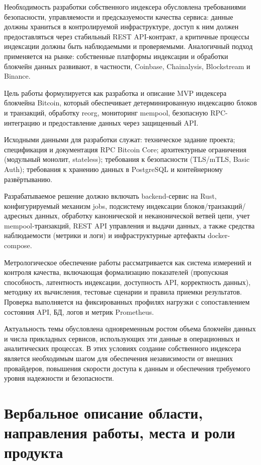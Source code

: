 ﻿\documentclass[14pt,a4paper]{extarticle}
\begin{document}
\noindent Необходимость разработки собственного индексера обусловлена требованиями безопасности, управляемости и предсказуемости качества сервиса: данные должны храниться в контролируемой инфраструктуре, доступ к ним должен предоставляться через стабильный REST API-контракт, а критичные процессы индексации должны быть наблюдаемыми и проверяемыми. Аналогичный подход применяется на рынке: собственные платформы индексации и обработки блокчейн данных развивают, в частности, Coinbase, Chainalysis, Blockstream и Binance.

\noindent Цель работы формулируется как разработка и описание MVP индексера блокчейна Bitcoin, который обеспечивает детерминированную индексацию блоков и транзакций, обработку reorg, мониторинг mempool, безопасную RPC-интеграцию и предоставление данных через защищенный API.

\noindent Исходными данными для разработки служат: техническое задание проекта; спецификация и документация RPC Bitcoin Core; архитектурные ограничения (модульный монолит, stateless); требования к безопасности (TLS/mTLS, Basic Auth); требования к хранению данных в PostgreSQL и контейнерному развёртыванию.

\noindent Разрабатываемое решение должно включать backend-сервис на Rust, конфигурируемый механизм jobs, подсистему индексации блоков/транзакций/адресных данных, обработку канонической и неканонической ветвей цепи, учет mempool-транзакций, REST API управления и выдачи данных, а также средства наблюдаемости (метрики и логи) и инфраструктурные артефакты docker-compose.

\noindent Метрологическое обеспечение работы рассматривается как система измерений и контроля качества, включающая формализацию показателей (пропускная способность, латентность индексации, доступность API, корректность данных), методику их вычисления, тестовые сценарии и правила приемки результатов. Проверка выполняется на фиксированных профилях нагрузки с сопоставлением состояния API, БД, логов и метрик Prometheus.

\noindent Актуальность темы обусловлена одновременным ростом объема блокчейн данных и числа прикладных сервисов, использующих эти данные в операционных и аналитических процессах. В этих условиях создание собственного индексера является необходимым шагом для обеспечения независимости от внешних провайдеров, повышения скорости доступа к данным и обеспечения требуемого уровня надежности и безопасности.

\newpage

\section{Вербальное описание области, направления работы, места и роли продукта}
\end{document}
